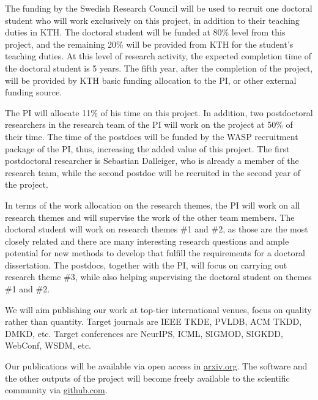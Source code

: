 \documentclass[a4paper,11pt]{article}
\begin{document}
The funding by the Swedish Research Council will be used to recruit 
one doctoral student who will work exclusively on this project, 
in addition to their teaching duties in KTH.
The doctoral student will be funded at 80\% level from this project, 
and the remaining 20\% will be provided from KTH for the student's teaching duties. 
At this level of research activity, the expected completion time of the doctoral student is 5 years. 
The fifth year, after the completion of the project, 
will be provided by KTH basic funding allocation to the PI, or other external funding source. 

The PI will allocate 11\% of his time on this project.
In addition, two postdoctoral researchers in the research team of the PI
will work on the project at 50\% of their time. 
The time of the postdocs will be funded by the WASP recruitment package of the PI, 
thus, increasing the added value of this project.
The first postdoctoral researcher is Sebastian Dalleiger, 
who is already a member of the research team, 
while the second postdoc will be recruited in the second year of the project.

In terms of the work allocation on the research themes, 
the PI will work on all research themes and will supervise the work of the other team members. 
The doctoral student will work on research themes \#1 and \#2, 
as those are the most closely related and there are many interesting research questions
and ample potential for new methods to develop that fulfill the requirements for a doctoral dissertation. 
The postdocs, together with the PI, will focus on carrying out research theme \#3,
while also helping supervising the doctoral student on themes \#1 and \#2.

We will aim publishing our work at top-tier international venues, 
focus on quality rather than quantity.
% 
Target journals 
are IEEE TKDE, PVLDB, ACM TKDD,  DMKD, etc. 
Target conferences are NeurIPS, ICML, SIGMOD, SIGKDD, WebConf, WSDM, etc.

Our publications will be available via open access in {\small\url{arxiv.org}}. 
The software and the other outputs of the project 
will become freely available to the scientific community via {\small\url{github.com}}. %
\end{document}
